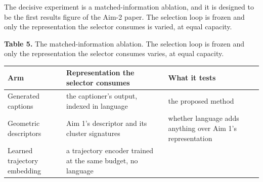 \documentclass[
  11pt,
]{article}
\begin{document}
The decisive experiment is a matched-information ablation, and it is
designed to be the first results figure of the Aim-2 paper. The
selection loop is frozen and only the representation the selector
consumes is varied, at equal capacity.

\textbf{Table 5.} The matched-information ablation. The selection loop
is frozen and only the representation the selector consumes varies, at
equal capacity.

\begin{longtable}[]{@{}lll@{}}
\toprule
\begin{minipage}[b]{0.30\columnwidth}\raggedright
Arm\strut
\end{minipage} & \begin{minipage}[b]{0.30\columnwidth}\raggedright
Representation the selector consumes\strut
\end{minipage} & \begin{minipage}[b]{0.30\columnwidth}\raggedright
What it tests\strut
\end{minipage}\tabularnewline
\midrule
\endhead
\begin{minipage}[t]{0.30\columnwidth}\raggedright
Generated captions\strut
\end{minipage} & \begin{minipage}[t]{0.30\columnwidth}\raggedright
the captioner's output, indexed in language\strut
\end{minipage} & \begin{minipage}[t]{0.30\columnwidth}\raggedright
the proposed method\strut
\end{minipage}\tabularnewline
\begin{minipage}[t]{0.30\columnwidth}\raggedright
Geometric descriptors\strut
\end{minipage} & \begin{minipage}[t]{0.30\columnwidth}\raggedright
Aim 1's descriptor and its cluster signatures\strut
\end{minipage} & \begin{minipage}[t]{0.30\columnwidth}\raggedright
whether language adds anything over Aim 1's representation\strut
\end{minipage}\tabularnewline
\begin{minipage}[t]{0.30\columnwidth}\raggedright
Learned trajectory embedding\strut
\end{minipage} & \begin{minipage}[t]{0.30\columnwidth}\raggedright
a trajectory encoder trained at the same budget, no language\strut
\end{minipage} & \begin{minipage}[t]{0.30\columnwidth}\raggedright

\end{minipage}
\end{longtable}
\end{document}
